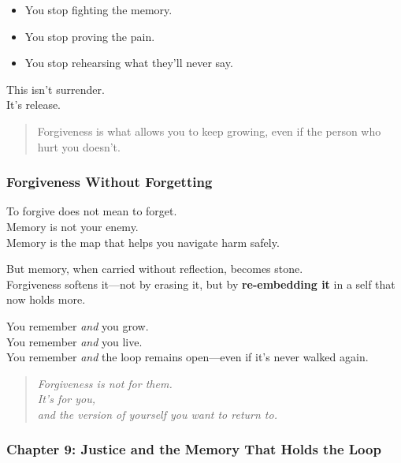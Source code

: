 \begin{itemize}
\item
  You stop fighting the memory.
\item
  You stop proving the pain.
\item
  You stop rehearsing what they'll never say.
\end{itemize}

This isn't surrender.\\
It's release.

\begin{quote}
Forgiveness is what allows you to keep growing, even if the person who
hurt you doesn't.
\end{quote}

\subsubsection{\texorpdfstring{\textbf{Forgiveness Without
Forgetting}}{Forgiveness Without Forgetting}}\label{forgiveness-without-forgetting}

To forgive does not mean to forget.\\
Memory is not your enemy.\\
Memory is the map that helps you navigate harm safely.

But memory, when carried without reflection, becomes stone.\\
Forgiveness softens it---not by erasing it, but by \textbf{re-embedding
it} in a self that now holds more.

You remember \emph{and} you grow.\\
You remember \emph{and} you live.\\
You remember \emph{and} the loop remains open---even if it's never
walked again.

\begin{quote}
\emph{Forgiveness is not for them.\\
It's for you,\\
and the version of yourself you want to return to.}
\end{quote}

\subsubsection{\texorpdfstring{ \textbf{Chapter 9: Justice and the Memory
That Holds the
Loop}}{ Chapter 9: Justice and the Memory That Holds the Loop}}\label{chapter-9-justice-and-the-memory-that-holds-the-loop}

